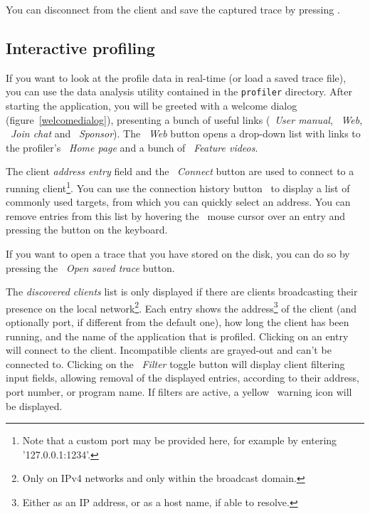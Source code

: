 \documentclass[hidelinks,titlepage,a4paper]{article}
\begin{document}
You can disconnect from the client and save the captured trace by pressing .

\subsection{Interactive profiling}
\label{interactiveprofiling}

If you want to look at the profile data in real-time (or load a saved trace file), you can use the data analysis utility contained in the \texttt{profiler} directory. After starting the application, you will be greeted with a welcome dialog (figure~\ref{welcomedialog}), presenting a bunch of useful links (\faBook{}~\emph{User manual}, \faGlobeAmericas{}~\emph{Web}, \faComment~\emph{Join chat} and \faHeart{}~\emph{Sponsor}). The \faGlobeAmericas{}~\emph{Web} button opens a drop-down list with links to the profiler's \emph{\faHome{}~Home page} and a bunch of \emph{\faVideo{}~Feature videos}.

The client \emph{address entry} field and the \faWifi{}~\emph{Connect} button are used to connect to a running client\footnote{Note that a custom port may be provided here, for example by entering '127.0.0.1:1234'.}. You can use the connection history button~\faCaretDown{} to display a list of commonly used targets, from which you can quickly select an address. You can remove entries from this list by hovering the \faMousePointer{}~mouse cursor over an entry and pressing the \keys{\del} button on the keyboard.

If you want to open a trace that you have stored on the disk, you can do so by pressing the \faFolderOpen{}~\emph{Open saved trace} button.

The \emph{discovered clients} list is only displayed if there are clients broadcasting their presence on the local network\footnote{Only on IPv4 networks and only within the broadcast domain.}. Each entry shows the address\footnote{Either as an IP address, or as a host name, if able to resolve.} of the client (and optionally port, if different from the default one), how long the client has been running, and the name of the application that is profiled. Clicking on an entry will connect to the client. Incompatible clients are grayed-out and can't be connected to. Clicking on the \emph{\faFilter{}~Filter} toggle button will display client filtering input fields, allowing removal of the displayed entries, according to their address, port number, or program name. If filters are active, a yellow \faExclamationTriangle{}~warning icon will be displayed.
\end{document}
